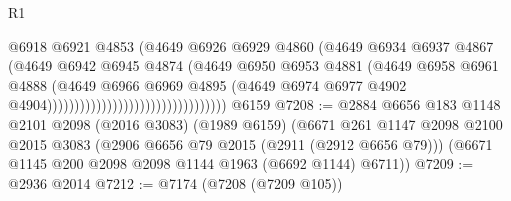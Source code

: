 \begin{lexlean}{R1}
\begin{coremodule}
                                                        @6918
                                                        @6921
                                                        @4853
                                                        (@4649
                                                          @6926
                                                          @6929
                                                          @4860
                                                          (@4649
                                                            @6934
                                                            @6937
                                                            @4867
                                                            (@4649
                                                              @6942
                                                              @6945
                                                              @4874
                                                              (@4649
                                                                @6950
                                                                @6953
                                                                @4881
                                                                (@4649
                                                                  @6958
                                                                  @6961
                                                                  @4888
                                                                  (@4649
                                                                    @6966
                                                                    @6969
                                                                    @4895
                                                                    (@4649
                                                                      @6974
                                                                      @6977
                                                                      @4902
                                                                      @4904)))))))))))))))))))))))))))))))))
    @6159
@7208 := @2884
    @6656
    @183
    @1148
    @2101
    @2098
    (@2016 @3083)
    (@1989 @6159)
    (@6671
      @261
      @1147
      @2098
      @2100
      @2015
      @3083
      (@2906 @6656 @79 @2015 (@2911 (@2912 @6656 @79)))
      (@6671 @1145 @200 @2098 @2098 @1144 @1963 (@6692 @1144) @6711))
@7209 := @2936 @2014
@7212 := @7174 (@7208 (@7209 @105))

\end{coremodule}
\end{lexlean}
